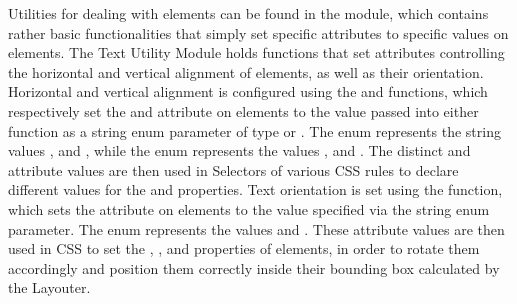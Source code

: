 Utilities for dealing with  elements can be found in the
 module, which contains rather basic
functionalities that simply set specific  attributes to
specific values on  elements.  The Text Utility Module
holds functions that set  attributes controlling the
horizontal and vertical alignment of  elements, as well
as their orientation.  Horizontal and vertical alignment is configured
using the  and 
functions, which respectively set the  and
 attribute on  elements to the value
passed into either function as a string enum parameter of type
 or .  The
 enum represents the string values
,  and , while the
 enum represents the values ,
 and .  The distinct
 and  attribute values are then
used in Selectors of various CSS rules to declare different values for
the  and  properties.  Text
orientation is set using the  function, which
sets the  attribute on  elements
to the value specified via the  string enum
parameter.  The  enum represents the values
 and .  These
 attribute values are then used in CSS to set
the , , and 
properties of  elements, in order to rotate them
accordingly and position them correctly inside their bounding box
calculated by the Layouter.


